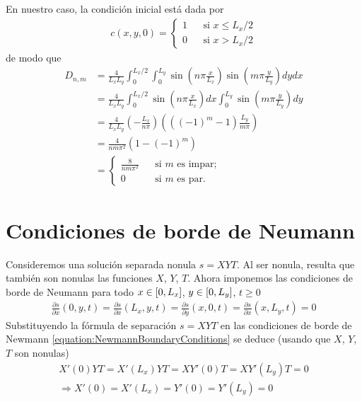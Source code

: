 \documentclass{article}
\newcommand{\leftOpenInterval}{\left]}
\newcommand{\rightOpenInterval}{\right[}
\newcommand{\leftClosedInterval}{\left[}
\newcommand{\rightClosedInterval}{\right]}
\newcommand{\interval}[3]{%
  \ifstrequal{#1}{oo}{%
    \leftOpenInterval #2, #3 \rightOpenInterval%
  }{%
    \ifstrequal{#1}{co}{%
      \leftClosedInterval #2, #3 \rightOpenInterval%
    }{%
      \ifstrequal{#1}{oc}{
        \leftOpenInterval #2, #3 \rightClosedInterval%
      }{%
        \ifstrequal{#1}{cc}{
          \leftClosedInterval #2, #3 \rightClosedInterval
        }{%
        }%
      }%
    }%
  }%
}
\begin{document}
  En nuestro caso, la condición inicial está dada por 
  \begin{align}
    \label{equation:initialCondition}
    c(x, y, 0)
    =
    \left\{
      \begin{aligned}
        1 &&\text{si } x \leq L_x /2 \\
        0 &&\text{si } x > L_x / 2
      \end{aligned}
    \right.
  \end{align}
  de modo que
  \begin{align}
    D_{n, m}
    &=
    \frac{4}{L_x L_y}
    \int_0^{L_x / 2}
      \int_0^{L_y}
        \sin\left( n \pi \frac{x}{L_x} \right)
        \sin\left( m \pi \frac{y}{L_y} \right)
      d y
    d x
    \\
    &=
    \frac{4}{L_x L_y}
    \int_0^{L_x / 2}
      \sin\left( n \pi \frac{x}{L_x} \right)
    d x
      \int_0^{L_y}
        \sin\left( m \pi \frac{y}{L_y} \right)
    d y
    \\
    &=
    \frac{4}{L_x L_y}
    \left( - \frac{L_x}{n \pi} \right)
    \left( ((- 1)^m - 1) \frac{L_y}{m \pi} \right)
    \\
    &=
    \frac{4}{n m \pi^2}
    (1 - (- 1)^m)
    \\
    &=
    \left\{
      \begin{aligned}
        \frac{8}{n m \pi^2}
          &&\text{si } m \text{ es impar;}
        \\
        0
          &&\text{si } m \text{ es par.}
      \end{aligned}
    \right.
  \end{align}

  \section{Condiciones de borde de Neumann}
  Consideremos una solución separada nonula \(s = X Y T\).
  Al ser nonula, resulta que también son nonulas las funciones \(X\), \(Y\), \(T\).
  Ahora imponemos las condiciones de borde de Neumann para todo \(x \in \interval{cc}{0}{L_x}\), \(y \in \interval{cc}{0}{L_y}\), \(t \geq 0\)
  \begin{align}
    \label{equation:NewmannBoundaryConditions}
    \frac{\partial s}{\partial x} (0, y, t)
    =
    \frac{\partial s}{\partial x} (L_x, y, t)
    =
    \frac{\partial s}{\partial y} (x, 0, t)
    =
    \frac{\partial s}{\partial x} (x, L_y, t)
    =
    0
  \end{align}
  Substituyendo la fórmula de separación \(s = X Y T\) en las condiciones de borde de Newmann \eqref{equation:NewmannBoundaryConditions} se deduce (usando que \(X\), \(Y\), \(T\) son nonulas)
  \begin{align}
    X'(0) Y T
    =
    X'(L_x) Y T
    =
    X Y'(0) T
    =
    X Y'(L_y) T
    =
    0
    \\
    \Rightarrow
    \label{equation:separatedNewmannBoundaryConditions}
    X'(0)
    =
    X'(L_x)
    =
    Y'(0)
    =
    Y'(L_y)
    =
    0
  \end{align}
\end{document}

